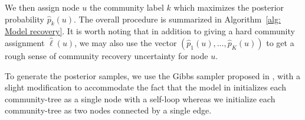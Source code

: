 \documentclass[twoside,11pt]{article}
\theoremstyle{remark}
\begin{document}
We then assign node $u$ the community label $k$ which maximizes the posterior probability $\hat{p}_k(u)$. The overall procedure is summarized in Algorithm~\ref{alg: Model recovery}. It is worth noting that in addition to giving a hard community assignment $\hat{\ell}(u)$, we may also use the vector $(\hat p_1(u), \ldots, \hat p_K(u))$ to get a rough sense of community recovery uncertainty for node $u$. 

To generate the posterior samples, we use the Gibbs sampler proposed in \cite{crane2024root}, with a slight modification to accommodate the fact that the model in \cite{crane2024root} initializes each community-tree as a single node with a self-loop whereas we initialize each community-tree as two nodes connected by a single edge. 

\end{document}
